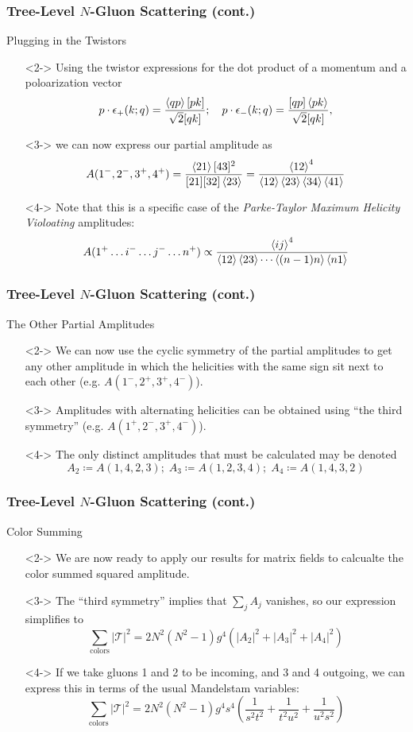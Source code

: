 \documentclass{beamer}
\begin{document}
\begin{frame}
    \frametitle{Tree-Level $N$-Gluon Scattering (cont.)}
    \alert{Plugging in the Twistors}
    \begin{itemize}
        \item[\textbullet]<2-> Using the twistor expressions for the dot product of a momentum and a poloarization vector \[ p\cdot\epsilon_+(k;q) = \frac{\ev{qp}[pk]}{\sqrt{2}[qk]}; \quad p\cdot\epsilon_-(k;q) = \frac{[qp]\ev{pk}}{\sqrt{2}[qk]}, \]
        \item[\textbullet]<3-> we can now express our partial amplitude as \[ A(1^-, 2^-, 3^+, 4^+) = \frac{\ev{21}[43]^2}{[21][32]\ev{23}} = \frac{\ev{12}^4}{\ev{12}\ev{23}\ev{34}\ev{41}} \]
        \item[\textbullet]<4-> Note that this is a specific case of the \textit{Parke-Taylor Maximum Helicity Violoating} amplitudes: \[ A(1^+\ldots i^-\ldots j^-\ldots n^+) \propto \frac{\ev{ij}^4}{\ev{12}\ev{23}\cdots\ev{(n-1)n}\ev{n1}} \]
        \end{itemize}
\end{frame}

\begin{frame}
    \frametitle{Tree-Level $N$-Gluon Scattering (cont.)}
    \alert{The Other Partial Amplitudes}
    \begin{itemize}
        \item[\textbullet]<2-> We can now use the cyclic symmetry of the partial amplitudes to get any other amplitude in which the helicities with the same sign sit next to each other (e.g. $A(1^-,2^+,3^+,4^-)$).
        \item[\textbullet]<3-> Amplitudes with alternating helicities can be obtained using ``the third symmetry'' (e.g. $A(1^+,2^-,3^+,4^-)$).
        \item[\textbullet]<4-> The only distinct amplitudes that must be calculated may be denoted \[ A_2 \coloneqq A(1,4,2,3); \; A_3 \coloneqq A(1,2,3,4); \; A_4 \coloneqq A(1,4,3,2) \]  
    \end{itemize}
\end{frame}

\begin{frame}
    \frametitle{Tree-Level $N$-Gluon Scattering (cont.)}
    \alert{Color Summing}
    \begin{itemize}
        \item[\textbullet]<2-> We are now ready to apply our results for matrix fields to calcualte the color summed squared amplitude.
        \item[\textbullet]<3-> The ``third symmetry'' implies that $\sum_jA_j$ vanishes, so our expression simplifies to \[ \sum_{\text{colors}}|\mathcal{T}|^2 = 2N^2(N^2 - 1)g^4\left(|A_2|^2 + |A_3|^2 + |A_4|^2\right) \]
        \item[\textbullet]<4-> If we take gluons 1 and 2 to be incoming, and 3 and 4 outgoing, we can express this in terms of the usual Mandelstam variables: \[ \sum_{\text{colors}}|\mathcal{T}|^2 = 2N^2(N^2 - 1)g^4s^4\left(\frac{1}{s^2t^2} + \frac{1}{t^2u^2} + \frac{1}{u^2s^2}\right) \]
    \end{itemize}
\end{frame}
\end{document}
